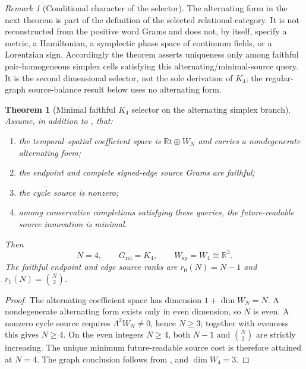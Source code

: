 \documentclass[11pt]{article}
\newtheorem{theorem}{Theorem}[section]
\theoremstyle{definition}
\theoremstyle{remark}
\newtheorem{remark}[remark]{Remark}
\newcommand{\R}{\mathbb R}
\begin{document}
\begin{remark}[Conditional character of the selector]
The alternating form in the next theorem is part of the definition of the
selected relational category.  It is not reconstructed from the positive word
Grams and does not, by itself, specify a metric, a Hamiltonian, a symplectic
phase space of continuum fields, or a Lorentzian sign.  Accordingly the theorem
asserts uniqueness only among faithful pair-homogeneous simplex cells satisfying
this alternating/minimal-source query.  It is the second dimensional selector,
not the sole derivation of $K_4$; the regular-graph source-balance result below
uses no alternating form.
\end{remark}

\begin{theorem}[Minimal faithful $K_4$ selector on the alternating simplex branch]
\label{thm:supp-k4-selector}
Assume, in addition to , that:
\begin{enumerate}[label=\textup{(D\arabic*)},leftmargin=3em]
\item the temporal--spatial coefficient space is $\R t\oplus W_N$ and carries a
      nondegenerate alternating form;
\item the endpoint and complete signed-edge source Grams are faithful;
\item the cycle source is nonzero;
\item among conservative completions satisfying these queries, the
      future-readable source innovation is minimal.
\end{enumerate}
Then
\begin{equation}
 N=4,
 \qquad
 G_{\mathrm{rel}}=K_4,
 \qquad
 W_{\mathrm{sp}}=W_4\cong\R^3.
 \label{eq:supp-k4-result}
\end{equation}
The faithful endpoint and edge source ranks are
$r_0(N)=N-1$ and $r_1(N)=\binom N2$.
\end{theorem}

\begin{proof}
The alternating coefficient space has dimension
$1+\dim W_N=N$.  A nondegenerate alternating form exists only in even
dimension, so $N$ is even.  A nonzero cycle source requires
$\Lambda^2W_N\ne0$, hence $N\ge3$; together with evenness this gives $N\ge4$.
On the even integers $N\ge4$, both $N-1$ and $\binom N2$ are strictly
increasing.  The unique minimum future-readable source cost is therefore
attained at $N=4$.  The graph conclusion follows from
, and $\dim W_4=3$.
\end{proof}
\end{document}

